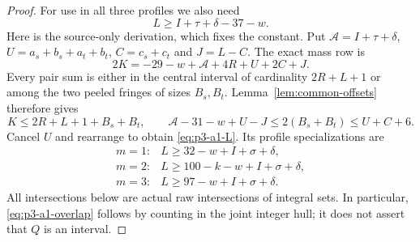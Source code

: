 \documentclass[11pt,letterpaper]{article}
\theoremstyle{definition}\newtheorem{definition}[theorem]{Definition}
\begin{document}
\begin{proof}
For use in all three profiles we also need
\begin{equation}\label{eq:p3-a1-L}
 L\ge I+\tau+\delta-37-w.
\end{equation}
Here is the source-only derivation, which fixes the constant.
Put $\mathcal A=I+\tau+\delta$, $U=a_s+b_s+a_t+b_t$,
$C=c_s+c_t$ and $J=L-C$. The exact mass row is
\[
 2K=-29-w+\mathcal A+4R+U+2C+J.
\]
Every pair sum is either in the central interval of cardinality
$2R+L+1$ or among the two peeled fringes of sizes $B_s,B_t$.
Lemma~\ref{lem:common-offsets} therefore gives
\[
 K\le2R+L+1+B_s+B_t,\qquad
 \mathcal A-31-w+U-J\le2(B_s+B_t)\le U+C+6.
\]
Cancel $U$ and rearrange to obtain \eqref{eq:p3-a1-L}. Its profile
specializations are
\begin{equation}\label{eq:p3-a1-L-profiles}
 \begin{array}{ll}
 m=1:&L\ge32-w+I+\sigma+\delta,\\
 m=2:&L\ge100-k-w+I+\sigma+\delta,\\
 m=3:&L\ge97-w+I+\sigma+\delta.
 \end{array}
\end{equation}
All intersections below are actual raw intersections of integral
sets. In particular, \eqref{eq:p3-a1-overlap} follows by counting in
the joint integer hull; it does not assert that $Q$ is an interval.


\end{proof}
\end{document}
